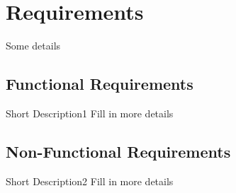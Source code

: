 
\section{Requirements}
\label{sec:requirements}
Some details

\subsection{Functional Requirements}

\begin{functional_requirement}{Short Description}{1}
Fill in more details 
\end{functional_requirement}

\subsection{Non-Functional Requirements}

\begin{nonfunctional_requirement}{Short Description}{2}
Fill in more details 
\end{nonfunctional_requirement}